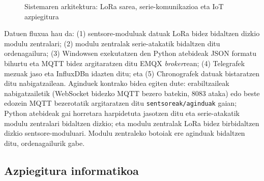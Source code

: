 \documentclass[10pt]{article}
\begin{document}
\begin{figure}[!htbp]
    \caption{Sistemaren arkitektura: \acs{LoRa} sarea, serie-komunikazioa eta \acs{IoT} azpiegitura}
    \label{fig:iot_final}
\end{figure}

Datuen fluxua hau da: (1) sentsore-moduluak datuak \ac{LoRa} bidez bidaltzen dizkio modulu zentralari; (2) modulu zentralak serie-atakatik bidaltzen ditu ordenagailura; (3) Windowsen exekutatzen den Python atebideak \ac{JSON} formatu bihurtu eta \ac{MQTT} bidez argitaratzen ditu EMQX \textit{broker}rean; (4) Telegrafek mezuak jaso eta InfluxDBn idazten ditu; eta (5) Chronografek datuak bistaratzen ditu nabigatzailean. Aginduek kontrako bidea egiten dute: erabiltzaileak nabigatzailetik (WebSocket bidezko \ac{MQTT} bezero batekin, 8083 ataka) edo beste edozein \ac{MQTT} bezerotatik argitaratzen ditu \texttt{sentsoreak/aginduak} gaian; Python atebideak gai horretara harpidetuta jasotzen ditu eta serie-atakatik modulu zentralari bidaltzen dizkio; eta modulu zentralak \ac{LoRa} bidez birbidaltzen dizkio sentsore-moduluari. Modulu zentraleko botoiak ere aginduak bidaltzen ditu, ordenagailurik gabe.\\

\subsection{Azpiegitura informatikoa}
\end{document}
